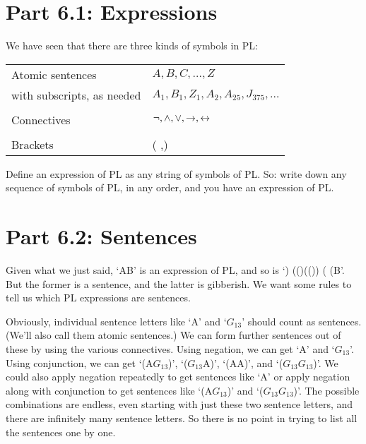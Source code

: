 \section{Part 6.1: Expressions}
\label{s:Part 6.1: Expressions}
We have seen that there are three kinds of symbols in PL:
\begin{center}
\begin{tabular}{l l}
Atomic sentences & $A,B,C,\ldots,Z$\\
with subscripts, as needed & $A_1, B_1,Z_1,A_2,A_{25},J_{375},\ldots$\\
\\
Connectives & $\neg,\wedge,\vee,\rightarrow,\leftrightarrow$\\
\\
Brackets &( ,)\\
\end{tabular}
\end{center}
Define an expression of PL as any string of symbols of PL. So: write down any sequence of symbols of PL, in any order, and you have an expression of PL.
\section{Part 6.2: Sentences}
Given what we just said, ‘A\eand B’ is an expression of PL, and so is ‘\enot) (\eor ()\eand (\enot\enot()) ( (B’. But the former is a sentence, and the latter is gibberish. We want some rules to tell us which PL expressions are sentences.

Obviously, individual sentence letters like ‘A’ and ‘$G_{13}$’ should count as sentences. (We’ll also call them atomic sentences.) We can form further sentences out of these by using the various connectives. Using negation, we can get ‘\enot A’ and ‘\enot $G_{13}$’. Using conjunction, we can get ‘(A\eand $G_{13}$)’, ‘($G_{13}$\eand A)’, ‘(A\eand A)’, and ‘($G_{13}$\eand $G_{13}$)’. We could also apply negation repeatedly to get sentences like ‘\enot\enot A’ or apply negation along with conjunction to get sentences like ‘\enot(A\eand $G_{13}$)’ and ‘\enot($G_{13}$\eand \enot $G_{13}$)’. The possible combinations are endless, even starting with just these two sentence letters, and there are infinitely many sentence letters. So there is no point in trying to list all the sentences one by one.

